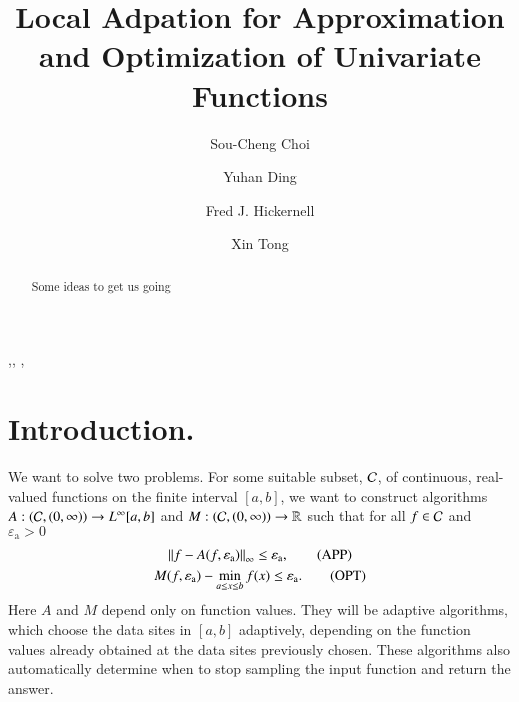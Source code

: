 \documentclass[review]{elsarticle}
\newcommand{\abstol}{\varepsilon_{\textrm{a}}}
\begin{document}
\begin{frontmatter}

\title{Local Adpation for Approximation and Optimization of Univariate Functions}


\author{Sou-Cheng Choi}
\author{Yuhan Ding}
\author{Fred J. Hickernell}
\author{Xin Tong}
\address{Department of Applied Mathematics, Illinois Institute of Technology, RE 208, 10 West 32$^{\text{nd}}$ Street, Chicago, Illinois, 60616, USA}

\begin{abstract}
Some ideas to get us going
\end{abstract}

\begin{keyword}
\sep \sep 
\MSC[2010]  \sep
\end{keyword}

\end{frontmatter}

\section{Introduction.} 

We want to solve two problems.  For some suitable subset, $\mathcal{C}$, of continuous, real-valued functions on the finite interval $[a,b]$, we want to construct  algorithms $A:(\mathcal{C},(0,\infty)) \to L^{\infty}[a,b]$ and $M: (\mathcal{C},(0,\infty)) \to \mathbb{R}$ such that for all $f \in \mathcal{C}$ and $\abstol > 0$
\begin{gather}
\norm[\infty]{f - A(f,\abstol)} \le \abstol,  \tag{APP} \\
M(f,\abstol) - \min_{a \le x \le b} f(x)  \le \abstol. \tag{OPT}
\end{gather}
Here $A$ and $M$ depend only on function values.  They will be adaptive algorithms, which choose the data sites in $[a,b]$ adaptively, depending on the function values already obtained at the data sites previously chosen.  These algorithms also automatically determine when to stop sampling the input function and return the answer.
\end{document}

